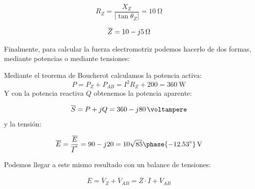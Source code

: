 \documentclass[12pt]{article}
\begin{document}
\[
  R_Z = \frac{X_Z}{|\tan\theta_Z|} = \SI{10}{\ohm}
\]

\[
  \overline{Z} =  \SI[parse-numbers=false]{10 - j5}{\ohm}
\]

Finalmente, para calcular la fuerza electromotriz podemos hacerlo de dos formas, mediante potencias o mediante tensiones:

Mediante el teorema de Boucherot calculamos la potencia activa:
\[
P = P_Z + P_{AB} = I^2 R_Z + 200 = \SI{360}{\watt}
\]
Y con la potencia reactiva $Q$ obtenemos la potencia aparente:

\[
  \overline{S} = P + jQ = \SI[parse-numbers=false]{360 -j80}{\voltampere}
\]
y la tensión:

\[
  \overline{E} = \frac{\overline{E}}{\overline{I}^*} = 90 - j20 = \SI[parse-numbers=false]{10\sqrt{85}\phase{\ang{-12.53}}}{\volt}
\]

Podemos llegar a este mismo resultado con un balance de tensiones:

\[
  \overline{E} = \overline{V}_Z + \overline{V}_{AB} = \overline{Z} \cdot \overline{I} + \overline{V}_{AB}
\]
\end{document}
